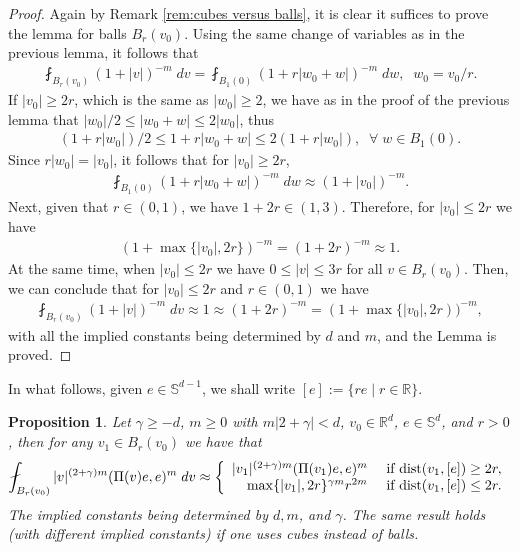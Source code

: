 \documentclass[12pt,american]{amsart}
\numberwithin{equation}{section}
\theoremstyle{plain}
\newtheorem{prop}[thm]{Proposition}
\theoremstyle{definition}                  %
\begin{document}
\begin{proof}
  Again by Remark \ref{rem:cubes versus balls}, it is clear it suffices to prove the lemma for balls $B_r(v_0)$. Using the same change of variables as in the previous lemma, it follows that
  \begin{align*}
    \fint_{B_r(v_0)}(1+|v|)^{-m}\;dv = \fint_{B_1(0)}(1+r|w_0+w|)^{-m}\;dw,\;\;w_0 = v_0/r.
  \end{align*}  	
  If $|v_0|\geq 2r$, which is the same as $|w_0|\geq 2$, we have as in the proof of the previous lemma that
  $|w_0|/2\leq |w_0+w|\leq 2|w_0|$, thus
  \begin{align*}
   (1+r|w_0|)/2 \leq 1+r|w_0+w| \leq 2(1+r|w_0|),\;\;\forall\;w\in B_1(0).
  \end{align*}
  Since $r|w_0|=|v_0|$, it follows that for $|v_0|\geq 2r$,
  \begin{align*}
    \fint_{B_1(0)}(1+r|w_0+w|)^{-m}\;dw \approx (1+|v_0|)^{-m}.
  \end{align*}  	
  Next, given that $r\in(0,1)$, we have $1+2r \in (1,3)$. Therefore, for $|v_0|\leq 2r$ we have
  \begin{align*}
    (1+\max\{|v_0|,2r\})^{-m} = (1+2r)^{-m} \approx 1.	  
  \end{align*}	  
  At the same time, when $|v_0|\leq 2r$ we have $0\leq |v|\leq 3r$ for all $v\in B_r(v_0)$. Then, we can conclude that for $|v_0|\leq 2r$ and $r\in(0,1)$ we have
  \begin{align*}
    \fint_{B_r(v_0)}(1+|v|)^{-m}\;dv \approx 1 \approx (1+2r)^{-m} = (1+\max\{|v_0|,2r) )^{-m},	  
  \end{align*}	  
  with all the implied constants being determined by $d$ and $m$, and the Lemma is proved.
\end{proof}

In what follows, given $e\in \mathbb{S}^{d-1}$, we shall write $[e] := \{ r e \mid r\in\mathbb{R} \}$.

\begin{prop} \label{prop:kernel averages}
  Let $\gamma\geq -d$, $m\geq 0$ with $m|2+\gamma|<d$, $v_0 \in \mathbb{R}^d$, $e\in\mathbb{S}^{d}$, and $r>0$, then for any $v_1 \in B_r(v_0)$ we have that
  \begin{align*}
    \fint_{B_r(v_0)}|v|^{(2+\gamma)m}(\Pi(v)e,e)^m\;dv\approx \left \{ \begin{array}{rl} 
      |v_1|^{(2+\gamma)m}(\Pi(v_1)e,e)^m & \textnormal{ if } \textnormal{dist}(v_1,[e]) \geq 2r,\\
      \max\{ |v_1|,2r\}^{\gamma m}r^{2m} & \textnormal{ if } \textnormal{dist}(v_1,[e])\leq 2r.	  	
    \end{array}\right.
  \end{align*}	  
  The implied constants being determined by $d, m$, and $\gamma$. The same result holds (with different implied constants) if one uses cubes instead of balls.
\end{prop}
\end{document}
